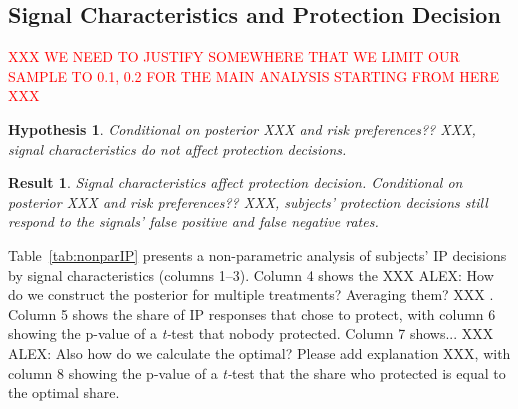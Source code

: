 \documentclass[12pt,a4paper]{article}
\newcommand{\agt}[1]{{\color{OliveGreen}#1}}
\newtheorem{hypothesis}{Hypothesis}
\newtheorem{result}{Result}
\begin{document}
\begin{figure}[H]
	\hfill
	\hfill
\end{figure}
\clearpage




\subsection{Signal Characteristics and Protection Decision}

\textcolor{red}{XXX WE NEED TO JUSTIFY SOMEWHERE THAT WE LIMIT OUR SAMPLE TO 0.1, 0.2 FOR THE MAIN ANALYSIS STARTING FROM HERE XXX}


\begin{hypothesis} Conditional on posterior \agt{XXX and risk preferences?? XXX}, signal characteristics do not affect protection decisions. \end{hypothesis}
\begin{result}\label{res:IPdeviations} Signal characteristics affect protection decision. Conditional on posterior \agt{XXX and risk preferences?? XXX}, subjects' protection decisions still respond to the signals' false positive and false negative rates. \end{result}

Table~\ref{tab:nonparIP} presents a non-parametric analysis of subjects' IP decisions by signal characteristics (columns 1--3). Column 4 shows the \agt{XXX ALEX: How do we construct the posterior for multiple treatments? Averaging them? XXX} . Column 5 shows the share of IP responses that chose to protect, with column 6 showing the p-value of a \emph{t-}test that nobody protected. Column 7 shows... \agt{XXX ALEX: Also how do we calculate the optimal? Please add explanation XXX}, with column 8 showing the p-value of a \emph{t-}test that the share who protected is equal to the optimal share.
\end{document}
